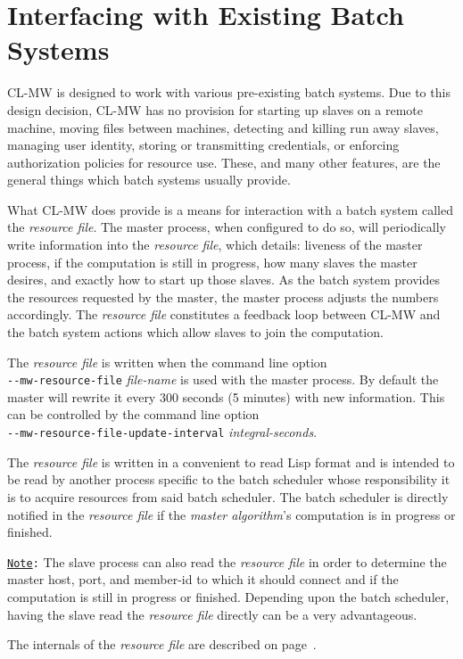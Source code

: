 \documentclass[titlepage,12pt]{book}
\newcommand{\xsmall}{\latexhtml{\small}{}}
\newcommand{\xnormalsize}{\latexhtml{\normalsize}{}}
\newcommand{\clmw}{\xsmall\textsc{CL-MW}\xnormalsize\xspace}
\newcommand{\ma}{\textit{master algorithm}\xspace}
\newcommand{\rfile}{\textit{resource file}\xspace}
\newcommand{\dash}{\texttt{-}}
\newcommand{\OptionV}[2]{\dash\dash\texttt{#1} \textit{#2}}
\newcommand{\Note}{\texttt{\underline{Note}:}\xspace}
\begin{document}
\chapter{Interfacing with Existing Batch Systems}

\clmw is designed to work with various pre-existing batch systems. Due
to this design decision, \clmw has no provision for starting up slaves
on a remote machine, moving files between machines, detecting and killing
run away slaves, managing user identity, storing or transmitting
credentials, or enforcing authorization policies for resource use.
These, and many other features, are the general things which batch
systems usually provide.

What \clmw does provide is a means for interaction with a batch system
called the \rfile.  The master process, when configured to do so,
will periodically write information into the \rfile, which details:
liveness of the master process, if the computation is still in progress,
how many slaves the master desires, and exactly how to start up those
slaves. As the batch system provides the resources requested by the
master, the master process adjusts the numbers accordingly. The
\rfile constitutes a feedback loop between \clmw and the batch
system actions which allow slaves to join the computation.

The \rfile is written when the command line option\\
\OptionV{mw-resource-file}{file-name} is used with the
master process. By default the master will rewrite it
every 300 seconds (5 minutes) with new information. This
can be controlled by the command line option\\
\OptionV{mw-resource-file-update-interval}{integral-seconds}.

The \rfile is written in a convenient to read Lisp format and is
intended to be read by another process specific to the batch scheduler
whose responsibility it is to acquire resources from said batch
scheduler. The batch scheduler is directly notified in the \rfile
if the {\ma}'s computation is in progress or finished.

\Note The slave process can also read the \rfile in order to determine
the master host, port, and member-id to which it should connect and
if the computation is still in progress or finished.  Depending upon
the batch scheduler, having the slave read the \rfile directly can
be a very advantageous.

The internals of the \rfile are described on
page~\pageref{resource-file}.
\end{document}
